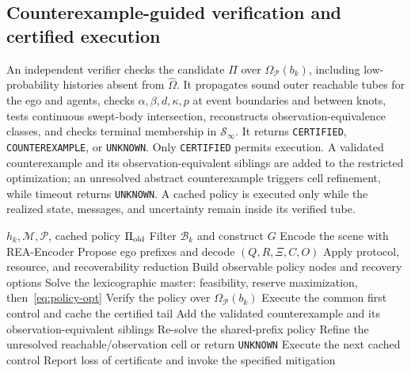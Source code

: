 \documentclass[letterpaper]{article} %
\newcommand{\Pset}{\ensuremath{\mathcal P}}
\newcommand{\Mset}{\ensuremath{\mathcal M}}
\newcommand{\Bset}{\ensuremath{\mathcal B}}
\newcommand{\Sset}{\ensuremath{\mathcal S}}
\newcommand{\RAMP}{\textsc{RAMP}}
\begin{document}
\subsection{Counterexample-guided verification and certified execution}
\label{sec:verify}
An independent verifier checks the candidate $\Pi$ over $\Omega_{\Pset}(b_k)$, including low-probability histories absent from $\widehat\Omega$. It propagates sound outer reachable tubes for the ego and agents, checks $\alpha,\beta,d,\kappa,p$ at event boundaries and between knots, tests continuous swept-body intersection, reconstructs observation-equivalence classes, and checks terminal membership in $\Sset_\infty$. It returns \texttt{CERTIFIED}, \texttt{COUNTEREXAMPLE}, or \texttt{UNKNOWN}. Only \texttt{CERTIFIED} permits execution. A validated counterexample and its observation-equivalent siblings are added to the restricted optimization; an unresolved abstract counterexample triggers cell refinement, while timeout returns \texttt{UNKNOWN}. A cached policy is executed only while the realized state, messages, and uncertainty remain inside its verified tube.

\begin{algorithm}[t]
\footnotesize
\caption{\RAMP-D online planning and refinement}
\label{alg:planner}
\begin{algorithmic}[1]
\Require $h_k,\Mset,\Pset$, cached policy $\Pi_{\rm old}$
\State Filter $\Bset_k$ and construct $G$
\State Encode the scene with REA-Encoder
\State Propose ego prefixes and decode $(Q,R,\Xi,C,O)$
\State Apply protocol, resource, and recoverability reduction
\State Build observable policy nodes and recovery options
\State Solve the lexicographic master: feasibility, reserve maximization, then~\eqref{eq:policy-opt}
  \State Verify the policy over $\Omega_{\Pset}(b_k)$
    \State Execute the common first control and cache the certified tail
    \State \Return
    \State Add the validated counterexample and its observation-equivalent siblings
    \State Re-solve the shared-prefix policy
  \Else
    \State Refine the unresolved reachable/observation cell or return \texttt{UNKNOWN}
  \EndIf
\EndWhile
{}
  \State Execute the next cached control
\Else
  \State Report loss of certificate and invoke the specified mitigation
\EndIf
\end{algorithmic}
\end{algorithm}
\end{document}
